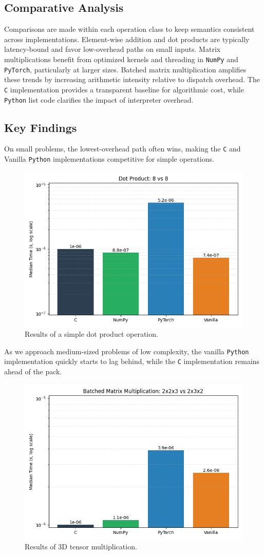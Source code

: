 \documentclass[a4paper,12pt]{article}
\begin{document}
\subsection{Comparative Analysis}
Comparisons are made within each operation class to keep semantics consistent across implementations. Element-wise addition and dot products are typically latency-bound and favor low-overhead paths on small inputs. Matrix multiplications benefit from optimized kernels and threading in \texttt{NumPy} and \texttt{PyTorch}, particularly at larger sizes. Batched matrix multiplication amplifies these trends by increasing arithmetic intensity relative to dispatch overhead. The \texttt{C} implementation provides a transparent baseline for algorithmic cost, while \texttt{Python} list code clarifies the impact of interpreter overhead.

\subsection{Key Findings}
On small problems, the lowest-overhead path often wins, making the \texttt{C} and Vanilla \texttt{Python} implementations competitive for simple operations. 

\begin{figure}[H]
  \centering
  \includegraphics[width=0.7\linewidth]{results/bar/DOT_8_8.png}
  \caption{Results of a simple dot product operation.}
  \label{fig:one}
\end{figure}

As we approach medium-sized problems of low complexity, the vanilla \texttt{Python} implementation quickly starts to lag behind, while the \texttt{C} implementation remains ahead of the pack.

\begin{figure}[H]
  \centering
  \includegraphics[width=0.7\linewidth]{results/bar/BMM_2x2x3_2x3x2.png}
  \caption{Results of 3D tensor multiplication.}
  \label{fig:two}
\end{figure}
\end{document}
